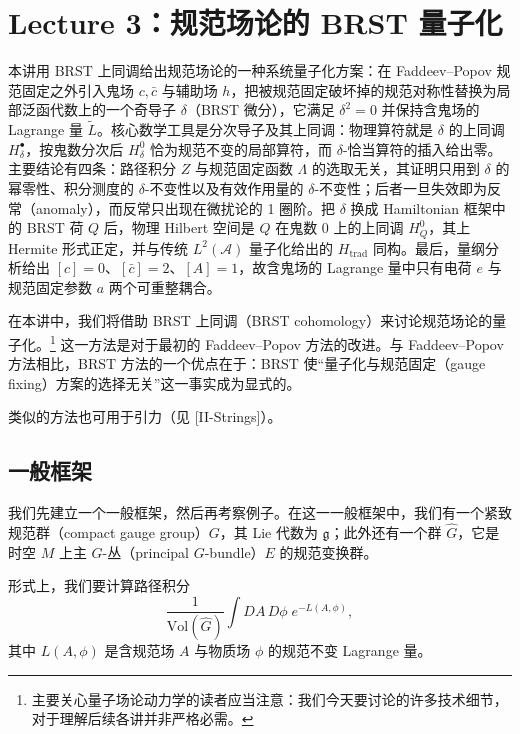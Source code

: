\section{Lecture 3：规范场论的 BRST 量子化}

\begin{keytakeaways}
本讲用 BRST 上同调给出规范场论的一种系统量子化方案：在 Faddeev–Popov 规范固定之外引入鬼场 $c,\bar c$ 与辅助场 $h$，把被规范固定破坏掉的规范对称性替换为局部泛函代数上的一个奇导子 $\delta$（BRST 微分），它满足 $\delta^2=0$ 并保持含鬼场的 Lagrange 量 $\widetilde L$。核心数学工具是分次导子及其上同调：物理算符就是 $\delta$ 的上同调 $H^\bullet_\delta$，按鬼数分次后 $H^0_\delta$ 恰为规范不变的局部算符，而 $\delta$-恰当算符的插入给出零。主要结论有四条：路径积分 $Z$ 与规范固定函数 $\Lambda$ 的选取无关，其证明只用到 $\delta$ 的幂零性、积分测度的 $\delta$-不变性以及有效作用量的 $\delta$-不变性；后者一旦失效即为反常（anomaly），而反常只出现在微扰论的 1 圈阶。把 $\delta$ 换成 Hamiltonian 框架中的 BRST 荷 $Q$ 后，物理 Hilbert 空间是 $Q$ 在鬼数 $0$ 上的上同调 $H^0_Q$，其上 Hermite 形式正定，并与传统 $L^2(\mathcal A)$ 量子化给出的 $H_{\mathrm{trad}}$ 同构。最后，量纲分析给出 $[c]=0$、$[\bar c]=2$、$[A]=1$，故含鬼场的 Lagrange 量中只有电荷 $e$ 与规范固定参数 $a$ 两个可重整耦合。
\end{keytakeaways}

在本讲中，我们将借助 BRST 上同调（BRST cohomology）来讨论规范场论的量子化。\footnote{主要关心量子场论动力学的读者应当注意：我们今天要讨论的许多技术细节，对于理解后续各讲并非严格必需。} 这一方法是对于最初的 Faddeev–Popov 方法的改进。与 Faddeev–Popov 方法相比，BRST 方法的一个优点在于：BRST 使“量子化与规范固定（gauge fixing）方案的选择无关”这一事实成为显式的。

类似的方法也可用于引力（见 [II-Strings]）。

\subsection{一般框架}

我们先建立一个一般框架，然后再考察例子。在这一一般框架中，我们有一个紧致规范群（compact gauge group）$G$，其 Lie 代数为 $\mathfrak{g}$；此外还有一个群 $\widehat{G}$，它是时空 $M$ 上主 $G$-丛（principal $G$-bundle）$E$ 的规范变换群。

形式上，我们要计算路径积分
\begin{equation}
  \tag{3.1}
  \label{eq:3-1}
  \frac{1}{\mathrm{Vol}(\widehat{G})}\int DA\,D\phi\;e^{-L(A,\phi)},
\end{equation}
其中 $L(A,\phi)$ 是含规范场 $A$ 与物质场 $\phi$ 的规范不变 Lagrange 量。

